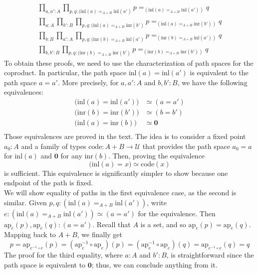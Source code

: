 \documentclass[14pt]{extarticle}
\newcommand{\0}{{\mathbf 0}}
\newcommand{\1}{{\mathbf 1}}
\newcommand{\2}{{\mathbf 2}}
\newcommand{\UU}{{\mathcal U}}
\newcommand{\inl}{\mathrm{inl}}
\newcommand{\inr}{\mathrm{inr}}
\newcommand{\ap}{\mathrm{ap}}
\begin{document}
\begin{align*}
\prod_{a,a':A}\prod_{p,q:(\inl(a) =_{A+B} \inl(a')} p =_{(\inl(a) =_{A+B} \inl(a'))} q\\
\prod_{a:A}\prod_{b':B}\prod_{p,q:(\inl(a) =_{A+B} \inr(b')} p =_{(\inl(a) =_{A+B} \inr(b'))} q\\
\prod_{b:B}\prod_{a':A}\prod_{p,q:(\inr(b) =_{A+B} \inl(a')} p =_{(\inr(b) =_{A+B} \inl(a'))} q\\
\prod_{b,b':B}\prod_{p,q:(\inr(b) =_{A+B} \inr(b')} p =_{(\inr(b) =_{A+B} \inr(b'))} q
\end{align*}
To obtain these proofs, we need to use the characterization of path spaces for the coproduct. In particular, the path space $\inl(a) = \inl(a')$ is equivalent to the path space $a = a'$. More precisely, for $a,a':A$ and $b,b':B$, we have the following equivalences:
\begin{align*}
\Big(\inl(a) = \inl(a')\Big) &\simeq (a = a') \\
\Big(\inr(b) = \inr(b')\Big) &\simeq (b = b') \\
\Big(\inl(a) = \inr(b)\Big) &\simeq \0 \\
\end{align*}
Those equivalences are proved in the text. The idea is to consider a fixed point $a_0 : A$ and a family of types $\text{code} : A+B \to \UU$ that provides the path space $a_0 = a$ for $\inl(a)$ and $\0$ for any $\inr(b)$. Then, proving the equivalence
\[\Big(\inl(a) = x\Big) \simeq \text{code}(x)\] is sufficient. This equivalence is significantly simpler to show because one endpoint of the path is fixed.\\
We will show equality of paths in the first equivalence case, as the second is similar. Given $p,q : (\inl(a) =_{A+B} \inl(a'))$, write $e : (\inl(a) =_{A+B} \inl(a')) \simeq (a = a')$ for the equivalence. Then $\ap_e(p),\ap_e(q) : (a = a')$. Recall that $A$ is a set, and so $\ap_e(p) = \ap_e(q)$. Mapping back to $A+B$, we finally get
\[ p = \ap_{e^{-1} \circ e}(p) = (\ap_e^{-1} \circ \ap_e)(p) = (\ap_e^{-1} \circ \ap_e)(q) = \ap_{e^{-1} \circ e}(q) = q\]
The proof for the third equality, where $a:A$ and $b':B$, is straightforward since the path space is equivalent to $\0$; thus, we can conclude anything from it.
\end{document}
